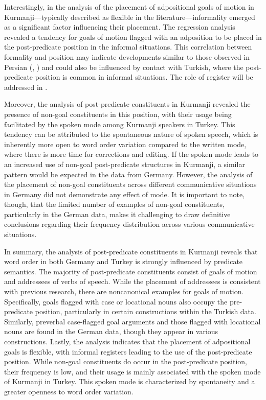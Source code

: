 Interestingly, in the analysis of the placement of adpositional goals of motion in Kurmanji—typically described as flexible in the literature—informality emerged as a significant factor influencing their placement. The regression analysis revealed a tendency for goals of motion flagged with an adposition to be placed in the post-predicate position in the informal situations. This correlation between formality and position may indicate developments similar to those observed in Persian (\citealt{Frommer1981}, \citealt{Haig_post-predicate_EtAl2024-1}) and could also be influenced by contact with Turkish, where the post-predicate position is common in informal situations. The role of register will be addressed in .

Moreover, the analysis of post-predicate constituents in Kurmanji revealed the presence of non-goal constituents in this position, with their usage being facilitated by the spoken mode among Kurmanji speakers in Turkey. This tendency can be attributed to the spontaneous nature of spoken speech, which is inherently more open to word order variation compared to the written mode, where there is more time for corrections and editing. If the spoken mode leads to an increased use of non-goal post-predicate structures in Kurmanji, a similar pattern would be expected in the data from Germany. However, the analysis of the placement of non-goal constituents across different communicative situations in Germany did not demonstrate any effect of mode. It is important to note, though, that the limited number of examples of non-goal constituents, particularly in the German data, makes it challenging to draw definitive conclusions regarding their frequency distribution across various communicative situations.

In summary, the analysis of post-predicate constituents in Kurmanji reveals that word order in both Germany and Turkey is strongly influenced by predicate semantics. The majority of post-predicate constituents consist of goals of motion and addressees of verbs of speech. While the placement of addressees is consistent with previous research, there are noncanonical examples for goals of motion. Specifically, goals flagged with case or locational nouns also occupy the pre-predicate position, particularly in certain constructions within the Turkish data. Similarly, preverbal case-flagged goal arguments and those flagged with locational nouns are found in the German data, though they appear in various constructions. Lastly, the analysis indicates that the placement of adpositional goals is flexible, with informal registers leading to the use of the post-predicate position. While non-goal constituents do occur in the post-predicate position, their frequency is low, and their usage is mainly associated with the spoken mode of Kurmanji in Turkey. This spoken mode is characterized by spontaneity and a greater openness to word order variation.

